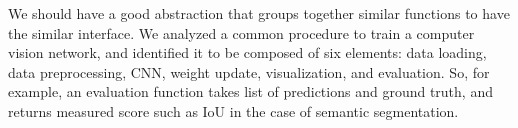 \documentclass[12pt]{article}
\begin{document}
We should have a good abstraction that groups together similar functions to have the similar interface.
We analyzed a common procedure to train a computer vision network,
 and identified it to be composed of six elements:
 data loading, data preprocessing, CNN, weight update, visualization, and evaluation.
So, for example, an evaluation function takes list of predictions and ground truth, and returns measured score such as IoU in the case of semantic segmentation.
\end{document}
